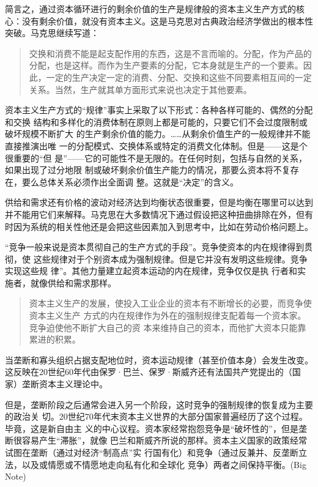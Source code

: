 简言之，通过资本循环进行的剩余价值的生产是规律般的资本主义生产方式的核心：没有剩余价值，就没有资本主义。这是马克思对古典政治经济学做出的根本性突破。马克思继续写道：

\begin{quotation}
交换和消费不能是起支配作用的东西，这是不言而喻的。分配，作为产品的分配，也是这样。而作为生产要素的分配，它本身就是生产的一个要素。因此，一定的生产决定一定的消费、分配、交换和这些不同要素相互间的一定关系。当然，生产就其单方面形式来说也决定于其他要素。 

\end{quotation}

资本主义生产方式的“规律”事实上采取了以下形式：各种各样可能的、偶然的分配和交换
结构和多样化的消费体制在原则上都是可能的，只要它们不会过度限制或破坏规模不断扩大
的生产剩余价值的能力。\ldots{}\ldots{}从剩余价值生产的一般规律并不能直接推演出唯
一的分配模式、交换体系或特定的消费文化体制。但是——这是个很重要的“但
是”——它的可能性不是无限的。在任何时刻，包括与自然的关系，如果出现了过分地限
制或破坏剩余价值生产能力的情况，那要么资本将不复存在，要么总体关系必须作出全面调
整。这就是“决定”的含义。

供给和需求还有价格的波动对经济达到均衡状态很重要，但是均衡在哪里可以达到并不能用它们来解释。马克思在大多数情况下通过假设把这种扭曲排除在外，但有时因为系统的相关性他还是会把这些因素加入到思考中，比如在劳动价格问题上。

“竞争一般来说是资本贯彻自己的生产方式的手段”。竞争使资本的内在规律得到贯彻，使
这些规律对于个别资本成为强制规律。但是它并没有发明这些规律。竞争实现这些规
律”。其他力量建立起资本运动的内在规律，竞争仅仅是执
行者和实施者，就像供给和需求那样。

\begin{quotation}
  资本主义生产的发展，使投入工业企业的资本有不断增长的必要，而竞争使资本主义生产
  方式的内在规律作为外在的强制规律支配着每一个资本家。竞争迫使他不断扩大自己的资
  本来维持自己的资本，而他扩大资本只能靠累进的积累。

\end{quotation}

当垄断和寡头组织占据支配地位时，资本运动规律（甚至价值本身）会发生改变。这反映在20世纪60年代由保罗·巴兰、保罗·斯威齐还有法国共产党提出的（国家）垄断资本主义理论中。

但是，垄断阶段之后通常会进入另一个阶段，这时竞争的强制规律的恢复成为主要的政治关
切。20世纪70年代末资本主义世界的大部分国家普遍经历了这个过程。毕竟，这是新自由主
义的中心议程。资本家经常抱怨竞争是“破坏性的”，但是垄断很容易产生“滞胀”，就像
巴兰和斯威齐所说的那样。资本主义国家的政策经常试图在垄断（通过对经济“制高点”实
行国有化）和竞争（通过反兼并、反垄断立法，以及或情愿或不情愿地走向私有化和全球化
竞争）两者之间保持平衡。(Big Note)

